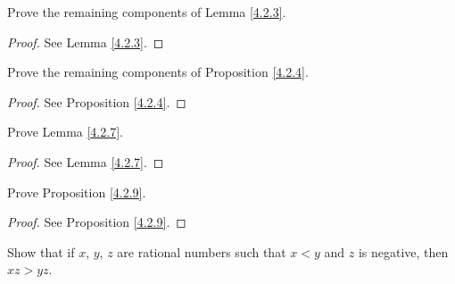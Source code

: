 \begin{exercise}\label{ex 4.2.2}
    Prove the remaining components of Lemma \ref{4.2.3}.
\end{exercise}

\begin{proof}
    See Lemma \ref{4.2.3}.
\end{proof}

\begin{exercise}\label{ex 4.2.3}
    Prove the remaining components of Proposition \ref{4.2.4}.
\end{exercise}

\begin{proof}
    See Proposition \ref{4.2.4}.
\end{proof}

\begin{exercise}\label{ex 4.2.4}
    Prove Lemma \ref{4.2.7}.
\end{exercise}

\begin{proof}
    See Lemma \ref{4.2.7}.
\end{proof}

\begin{exercise}\label{ex 4.2.5}
    Prove Proposition \ref{4.2.9}.
\end{exercise}

\begin{proof}
    See Proposition \ref{4.2.9}.
\end{proof}

\begin{exercise}\label{ex 4.2.6}
    Show that if \(x\), \(y\), \(z\) are rational numbers such that \(x < y\) and \(z\) is negative, then \(xz > yz\).
\end{exercise}

